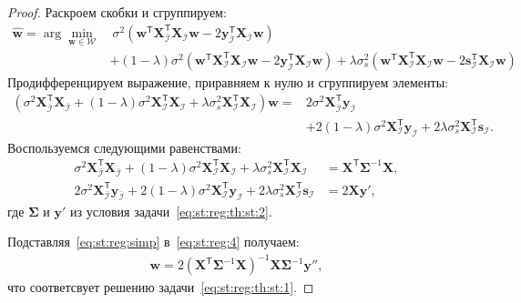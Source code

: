 \begin{proof}
Раскроем скобки и сгруппируем:
\[
\label{eq:st:reg:3}
\begin{aligned}
\hat{\mathbf{w}} = \arg\min_{\mathbf{w}\in \mathcal{W}} &~ \sigma^2\left(\mathbf{w}^{\mathsf{T}}\mathbf{X}^{\mathsf{T}}_{\bar{\mathcal{I}}}\mathbf{X}_{\bar{\mathcal{I}}}\mathbf{w} - 2\mathbf{y}^{\mathsf{T}}_{\bar{\mathcal{I}}}\mathbf{X}_{\bar{\mathcal{I}}}\mathbf{w}\right) \\
&+ \left(1-\lambda\right)\sigma^2\left(\mathbf{w}^{\mathsf{T}}\mathbf{X}^{\mathsf{T}}_{\mathcal{I}}\mathbf{X}_{\mathcal{I}}\mathbf{w}- 2\mathbf{y}^{\mathsf{T}}_{\mathcal{I}}\mathbf{X}_{\mathcal{I}}\mathbf{w}\right) + \lambda\sigma^2_s\left(\mathbf{w}^{\mathsf{T}}\mathbf{X}^{\mathsf{T}}_{\mathcal{I}}\mathbf{X}_{\mathcal{I}}\mathbf{w}- 2\mathbf{s}^{\mathsf{T}}_{\mathcal{I}}\mathbf{X}_{\mathcal{I}}\mathbf{w}\right)
\end{aligned}
\]
Продифференцируем выражение, приравняем к нулю и сгруппируем элементы:
\[
\label{eq:st:reg:4}
\begin{aligned}
\left(\sigma^{2}\mathbf{X}^{\mathsf{T}}_{\bar{\mathcal{I}}}\mathbf{X}_{\bar{\mathcal{I}}} + \left(1-\lambda\right)\sigma^2\mathbf{X}^{\mathsf{T}}_{\mathcal{I}}\mathbf{X}_{\mathcal{I}} + \lambda\sigma^{2}_s\mathbf{X}^{\mathsf{T}}_{\mathcal{I}}\mathbf{X}_{\mathcal{I}}\right) \mathbf{w} =& 2\sigma^2\mathbf{X}^{\mathsf{T}}_{\bar{\mathcal{I}}}\mathbf{y}_{\bar{\mathcal{I}}} \\
&+ 2\left(1-\lambda\right)\sigma^2\mathbf{X}^{\mathsf{T}}_{\mathcal{I}}\mathbf{y}_{\mathcal{I}} + 2\lambda\sigma_s^2\mathbf{X}^{\mathsf{T}}_{\mathcal{I}}\mathbf{s}_{\mathcal{I}}.
\end{aligned}
\]
Воспользуемся следующими равенствами:
\[
\label{eq:st:reg:simp}
\begin{aligned}
\sigma^{2}\mathbf{X}^{\mathsf{T}}_{\bar{\mathcal{I}}}\mathbf{X}_{\bar{\mathcal{I}}} + \left(1-\lambda\right)\sigma^2\mathbf{X}^{\mathsf{T}}_{\mathcal{I}}\mathbf{X}_{\mathcal{I}} + \lambda\sigma^{2}_s\mathbf{X}^{\mathsf{T}}_{\mathcal{I}}\mathbf{X}_{\mathcal{I}} &= \mathbf{X}^{\mathsf{T}}\bm{\Sigma}^{-1}\mathbf{X},\\
2\sigma^2\mathbf{X}^{\mathsf{T}}_{\bar{\mathcal{I}}}\mathbf{y}_{\bar{\mathcal{I}}} + 2\left(1-\lambda\right)\sigma^2\mathbf{X}^{\mathsf{T}}_{\mathcal{I}}\mathbf{y}_{\mathcal{I}} + 2\lambda\sigma_s^2\mathbf{X}^{\mathsf{T}}_{\mathcal{I}}\mathbf{s}_{\mathcal{I}} &= 2\mathbf{X}\mathbf{y'},
\end{aligned}
\]
где $\bm{\Sigma}$ и $\mathbf{y'}$ из условия задачи~\eqref{eq:st:reg:th:st:2}.

Подставляя~\eqref{eq:st:reg:simp} в~\eqref{eq:st:reg:4} получаем:
\[
\label{eq:st:reg:5}
\begin{aligned}
\mathbf{w} = 2\left(\mathbf{X}^{\mathsf{T}}\bm{\Sigma}^{-1}\mathbf{X}\right)^{-1}\mathbf{X}\bm{\Sigma}^{-1}\mathbf{y''},
\end{aligned}
\]
что соответсвует решению задачи~\eqref{eq:st:reg:th:st:1}.
\end{proof}

